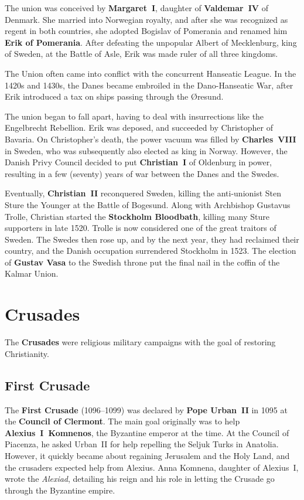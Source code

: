 The union was conceived by \textbf{Margaret~I}, daughter of \textbf{Valdemar~IV} of Denmark.
She married into Norwegian royalty, and after she was recognized as regent in both countries,
she adopted Bogislav of Pomerania and renamed him \textbf{Erik of Pomerania}.
After defeating the unpopular Albert of Mecklenburg, king of Sweden, at the Battle of Asle,
Erik was made ruler of all three kingdoms.

The Union often came into conflict with the concurrent Hanseatic League.
In the 1420s and 1430s, the Danes became embroiled in the Dano-Hanseatic War,
after Erik introduced a tax on ships passing through the \O{}resund.

The union began to fall apart, having to deal with insurrections like the Engelbrecht Rebellion.
Erik was deposed, and succeeded by Christopher of Bavaria.
On Christopher's death, the power vacuum was filled by \textbf{Charles~VIII} in Sweden,
who was subsequently also elected as king in Norway.
However, the Danish Privy Council decided to put \textbf{Christian~I} of Oldenburg in power,
resulting in a few (seventy) years of war between the Danes and the Swedes.

Eventually, \textbf{Christian~II} reconquered Sweden,
killing the anti-unionist Sten Sture the Younger at the Battle of Bogesund.
Along with Archbishop Gustavus Trolle,
Christian started the \textbf{Stockholm Bloodbath}, killing many Sture supporters in late 1520.
Trolle is now considered one of the great traitors of Sweden.
The Swedes then rose up, and by the next year,
they had reclaimed their country, and the Danish occupation surrendered Stockholm in 1523.
The election of \textbf{Gustav Vasa} to the Swedish throne
put the final nail in the coffin of the Kalmar Union.

\section{Crusades}

The \textbf{Crusades} were religious military campaigns with the goal of restoring Christianity.

\subsection*{First Crusade}

The \textbf{First Crusade} (1096--1099) was declared by \textbf{Pope Urban~II}
in 1095 at the \textbf{Council of Clermont}.
The main goal originally was to help \textbf{Alexius~I~Komnenos}, the Byzantine emperor at the time.
At the Council of Piacenza, he asked Urban~II for help repelling the Seljuk Turks in Anatolia.
However, it quickly became about regaining Jerusalem and the Holy Land,
and the crusaders expected help from Alexius.
Anna Komnena, daughter of Alexius~I, wrote the \textit{Alexiad},
detailing his reign and his role in letting the Crusade go through the Byzantine empire.

